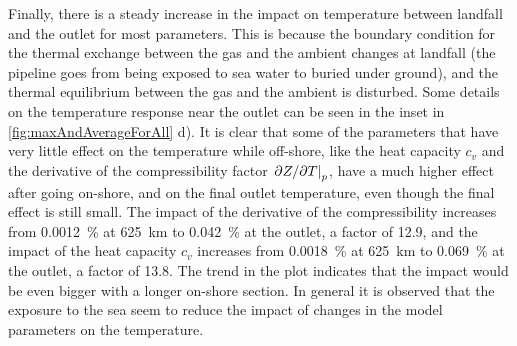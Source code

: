Finally, there is a steady increase in the impact on temperature between landfall and the outlet for most parameters. This is because the boundary condition for the thermal exchange between the gas and the ambient changes at landfall (the pipeline goes from being exposed to sea water to buried under ground), and the thermal equilibrium between the gas and the ambient is disturbed. %
%
Some details on the temperature response near the outlet can be seen in the inset in \cref{fig:maxAndAverageForAll} d). It is clear that some of the parameters that have very little effect on the temperature while off-shore, like the heat capacity $c_v$ and the derivative of the compressibility factor $\eval{\partial Z/\partial T}_p$, have a much higher effect after going on-shore, and on the final outlet temperature, even though the final effect is still small. The impact of the derivative of the compressibility increases from \SI{0.0012}{\percent} at \SI{625}{\kilo\meter} to \SI{0.042}{\percent} at the outlet, a factor of 12.9, and the impact of the heat capacity $c_v$ increases from \SI{0.0018}{\percent} at \SI{625}{\kilo\meter} to \SI{0.069}{\percent} at the outlet, a factor of 13.8. The trend in the plot indicates that the impact would be even bigger with a longer on-shore section. In general it is observed that the exposure to the sea seem to reduce the impact of changes in the model parameters on the temperature.



